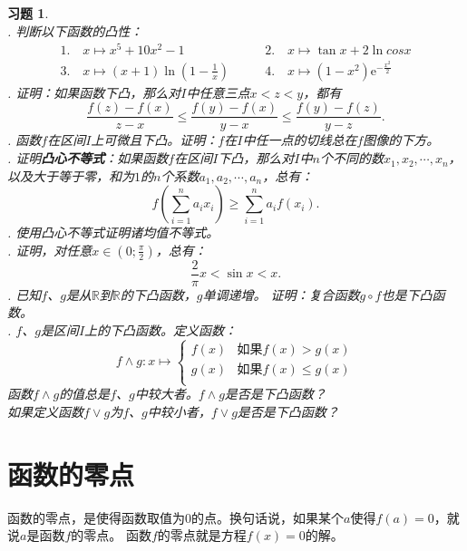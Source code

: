 \documentclass[12pt,UTF8]{ctexbook}
\theoremstyle{definition}
\theoremstyle{plain}
\newtheorem{xt}{习题}[section]
\begin{document}
\begin{xt}
    \mbox{} \\
    . 判断以下函数的凸性：
    $$
    \begin{array}{ll}
        1. \quad x \mapsto x^5 + 10x^2 - 1 \qquad &2. \quad x \mapsto \tan{x} + 2\ln{cos{x}} \\
        3. \quad x \mapsto (x+1)\ln{\left(1 - \frac{1}{x}\right)} \qquad &4. \quad x \mapsto \left(1 - x^2\right)\mathrm{e}^{-\frac{x^2}{2}}
    \end{array}
    $$
    . 证明：如果函数下凸，那么对$I$中任意三点$x < z < y$，都有
    $$ \frac{f(z) - f(x)}{z - x} \leqslant \frac{f(y) - f(x)}{y - x}  \leqslant \frac{f(y) - f(z)}{y - z}. $$
    . 函数$f$在区间$I$上可微且下凸。证明：$f$在$I$中任一点的切线总在$f$图像的下方。\\
    . 证明\textbf{凸心不等式}：如果函数$f$在区间$I$下凸，那么对$I$中$n$个不同的数$x_1, x_2, \cdots , x_n$，
    以及大于等于零，和为$1$的$n$个系数$a_1, a_2, \cdots, a_n$，总有：
    $$ f\left(\sum_{i=1}^n a_i x_i\right) \geqslant \sum_{i=1}^n a_i f(x_i). $$
    . 使用凸心不等式证明诸均值不等式。\\
    . 证明，对任意$x\in\left(0; \frac{\pi}{2}\right)$，总有：
    $$ \frac{2}{\pi} x < \sin{x} < x.$$
    . 已知$f$、$g$是从$\mathbb{R}$到$\mathbb{R}$的下凸函数，$g$单调递增。
    证明：复合函数$g\circ f$也是下凸函数。\\
    . $f$、$g$是区间$I$上的下凸函数。定义函数：
    $$ f \wedge g : x \mapsto \left\{
        \begin{array}{cl}
            f(x) & \mbox{如果} f(x) > g(x) \\
            g(x) & \mbox{如果} f(x) \leqslant g(x) \\
        \end{array}
    \right.
    $$
    \indent 函数$f \wedge g$的值总是$f$、$g$中较大者。$f \wedge g$是否是下凸函数？\\
    \indent 如果定义函数$f \vee g$为$f$、$g$中较小者，$f \vee g$是否是下凸函数？

\end{xt}

\section{函数的零点}

函数的零点，是使得函数取值为$0$的点。换句话说，如果某个$a$使得$f(a) = 0$，就说$a$是函数$f$的零点。
函数$f$的零点就是方程$f(x) = 0$的解。
\end{document}

